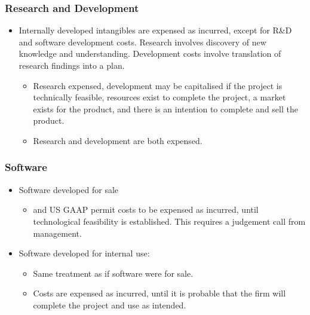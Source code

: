 \documentclass[../notes_compiled.tex]{subfiles}
\begin{document}
\subsubsection{Research and Development}
\label{randd}
\begin{itemize}
\item Internally developed intangibles are expensed as incurred, except for R\&D and software development costs. Research involves discovery of new knowledge and understanding. Development costs involve translation of research findings into a plan.
\begin{itemize}
\item[IFRS] Research expensed, development may be capitalised if the project is technically feasible, resources exist to complete the project, a market exists for the product, and there is an intention to complete and sell the product.
\item[US GAAP] Research and development are both expensed.
\end{itemize}
\end{itemize}

\subsubsection{Software}
\label{software}
\begin{itemize}
\item Software developed for sale
\begin{itemize}
\item[IFRS] and US GAAP permit costs to be expensed as incurred, until technological feasibility is established. This requires a judgement call from management.
\end{itemize}

\item Software developed for internal use:
\begin{itemize}
\item[IFRS] Same treatment as if software were for sale.
\item[US GAAP] Costs are expensed as incurred, until it is probable that the firm will complete the project and use as intended.
\end{itemize}
\end{itemize}
\end{document}
